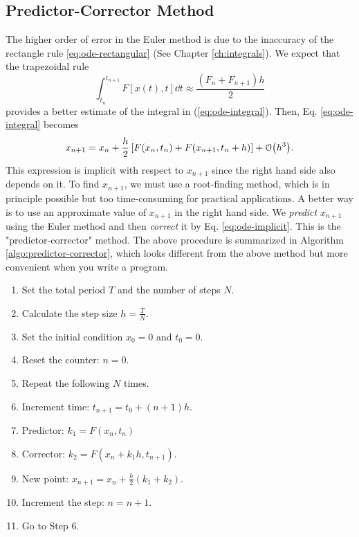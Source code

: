 \subsection{Predictor-Corrector Method}

The higher order of error in the Euler method  is due to the inaccuracy of the rectangle rule \eqref{eq:ode-rectangular} (See Chapter \ref{ch:integrals}).
We expect that the trapezoidal rule 
\begin{equation}\label{eq:ode-trapezoidal}
    \int_{t_n}^{t_{n+1}} F[x(t),t]\dd{t}\approx \frac{(F_n + F_{n+1}) h}{2}
\end{equation}
provides a better estimate of the integral in (\ref{eq:ode-integral}).
Then, Eq. \eqref{eq:ode-integral} becomes
\begin{equation}\label{eq:ode-implicit}
x_{n+1} = x_n + \frac{h}{2}
\left[ F(x_n,t_n) + F(x_{n+1},t_n+h) \right] + \order{h^3}.
\end{equation}
This expression is 	implicit with respect to $x_{n+1}$ since the right hand side also depends on it.
To find $x_{n+1}$, we must use a root-finding method,
which is in principle possible but too time-consuming for practical applications.  A better way is to use an approximate value of $x_{n+1}$ in the right hand side. We \emph{predict} $x_{n+1}$ using the Euler method and then \emph{correct} it by Eq. \eqref{eq:ode-implicit}.  This is the "predictor-corrector" method.  The above procedure is summarized in Algorithm \ref{algo:predictor-corrector}, which looks different from the above method but more convenient when you write a program.

\bigskip

\begin{myalgobox}
	\label{algo:predictor-corrector}
		
	\medskip
	\begin{minipage}{5.5in}
		\begin{enumerate}
			\item Set the total period $T$ and the number of steps $N$.
			\item Calculate the step size $h=\displaystyle\frac{T}{N}$.
			\item Set the initial condition $x_0=0$ and $t_0=0$.
			\item Reset the counter: $n=0$.
			\item Repeat the following $N$ times.
			\item Increment time: $t_{n+1}=t_0 + (n+1)h$.
			\item Predictor: $k_1 = F(x_n,t_n)$						
			\item Corrector: $k_2 = F(x_n+k_1 h,t_{n+1}) $.
			\item New point: $x_{n+1}=x_n + \displaystyle\frac{h}{2} \left ( k_1 + k_2 \right )$.
			\item Increment the step: $n=n+1$.
			\item Go to Step 6.
		\end{enumerate}
	\end{minipage}
\end{myalgobox}



